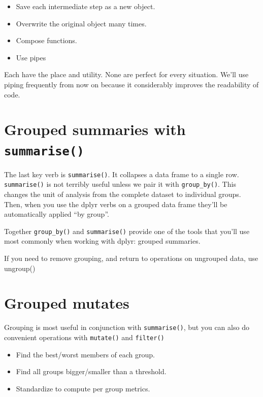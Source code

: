 \documentclass[]{book}
\providecommand{\tightlist}{%
  \setlength{\itemsep}{0pt}\setlength{\parskip}{0pt}}
\let\BeginKnitrBlock\begin \let\EndKnitrBlock\end
\begin{document}
\begin{itemize}
\tightlist
\item
  Save each intermediate step as a new object.
\item
  Overwrite the original object many times.
\item
  Compose functions.
\item
  Use pipes
\end{itemize}

Each have the place and utility. None are perfect for every situation.
We'll use piping frequently from now on because it considerably improves
the readability of code.

\section{\texorpdfstring{Grouped summaries with
\texttt{summarise()}}{Grouped summaries with summarise()}}\label{grouped-summaries-with-summarise}

The last key verb is \texttt{summarise()}. It collapses a data frame to
a single row. \texttt{summarise()} is not terribly useful unless we pair
it with \texttt{group\_by()}. This changes the unit of analysis from the
complete dataset to individual groups. Then, when you use the dplyr
verbs on a grouped data frame they'll be automatically applied ``by
group''.

Together \texttt{group\_by()} and \texttt{summarise()} provide one of
the tools that you'll use most commonly when working with dplyr: grouped
summaries.

\BeginKnitrBlock{rmdimportant}
If you need to remove grouping, and return to operations on ungrouped
data, use ungroup()
\EndKnitrBlock{rmdimportant}

\section{Grouped mutates}\label{grouped-mutates}

Grouping is most useful in conjunction with \texttt{summarise()}, but
you can also do convenient operations with \texttt{mutate()} and
\texttt{filter()}

\begin{itemize}
\tightlist
\item
  Find the best/worst members of each group.
\item
  Find all groups bigger/smaller than a threshold.
\item
  Standardize to compute per group metrics.
\end{itemize}
\end{document}
